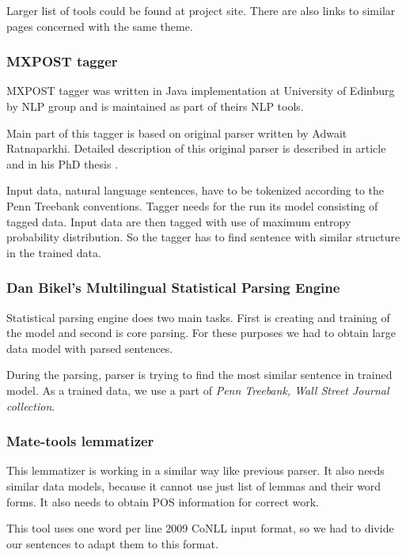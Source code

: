 Larger list of tools could be found at project site. There are also links to similar pages concerned with the same theme. 
          
\subsubsection{MXPOST tagger} 
MXPOST tagger was written in Java implementation at University of Edinburg by NLP group and is maintained as part of theirs NLP tools.
        
Main part of this tagger is based on original parser written by Adwait Ratnaparkhi. Detailed description of this original parser is described in article \cite{Linguistics-ratnaparkhi96} and in his PhD thesis \cite{Linguistics-ratnaparkhi98}. 

Input data, natural language sentences, have to be tokenized according to the Penn Treebank conventions. Tagger needs for the run its model consisting of tagged data. Input data are then tagged with use of maximum entropy probability distribution. So the tagger has to find sentence with similar structure in the trained data.
  
\subsubsection{Dan Bikel's Multilingual Statistical Parsing Engine}   

Statistical parsing engine does two main tasks. First is creating and training of the model and second is core parsing. For these purposes we had to obtain large data model with parsed sentences. 

During the parsing, parser is trying to find the most similar sentence in trained model. As a trained data, we use a part of \emph{Penn Treebank, Wall Street Journal collection}.

\subsubsection{Mate-tools lemmatizer}          
          
This lemmatizer is working in a similar way like previous parser. It also needs similar data models, because it cannot use just list of lemmas and their word forms. It also needs to obtain POS information for correct work.

This tool uses one word per line 2009 CoNLL input format, so we had to divide our sentences to adapt them to this format.

